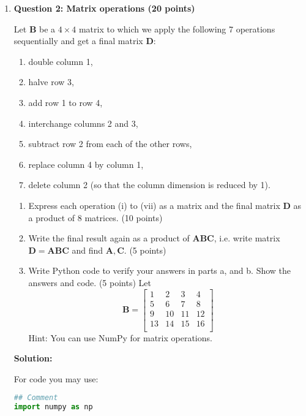 \documentclass[11pt,letterpaper]{article}
\begin{document}
\begin{enumerate}
\clearpage
\item[] \textbf{Question 2: Matrix operations (20 points)} 

Let $\mathbf{B}$ be a $4\times 4$ matrix to which we apply the following 7 operations sequentially and get a final matrix $\mathbf{D}$:
\begin{enumerate}[label=(\roman*),align=left]
    \item double column 1,
    \item halve row 3,
    \item add row 1 to row 4,
    \item interchange columns 2 and 3,
    \item subtract row 2 from each of the other rows,
    \item replace column 4 by column 1,
    \item delete column 2 (so that the column dimension is reduced by 1).
\end{enumerate}
\begin{enumerate}
    \item Express each operation (i) to (vii) as a matrix and  the final matrix $\mathbf{D}$ as a product of 8 matrices. (10 points)
    \item Write the final result again as a product of $\mathbf{ABC}$, i.e. write matrix $\mathbf{D} = \mathbf{ABC}$ and find $\mathbf{A},\mathbf{C}$. (5 points)
    \item Write Python code to verify your answers in parts a, and b. Show the answers and code. (5 points)
    Let
    \[
     \mathbf{B} = \begin{bmatrix}
        1 & 2 & 3 & 4\\
        5 & 6 & 7 & 8\\
        9 & 10 & 11 & 12\\
        13 & 14 & 15 & 16\\
    \end{bmatrix}
    \]
    Hint: You can use NumPy for matrix operations. 
\end{enumerate}

\textbf{Solution:}

For code you may use:
\begin{lstlisting}[language=python]
## Comment
import numpy as np
\end{lstlisting}


\end{enumerate}
\end{document}
